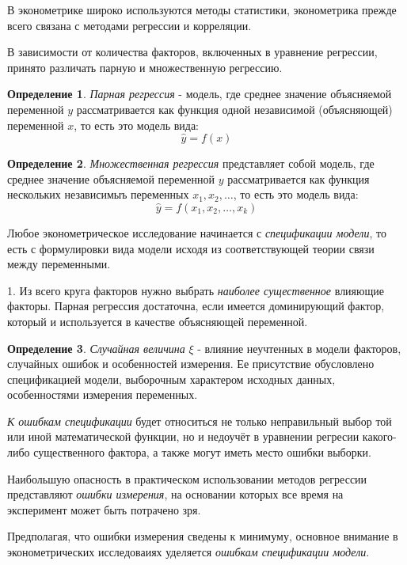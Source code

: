 \documentclass[aps,%
12pt,%
final,%
oneside,
onecolumn,%
musixtex, %
superscriptaddress,%
centertags]{article} %
\theoremstyle{plain}
\theoremstyle{definition}
\newtheorem{definition}{Определение}[subsection]
\theoremstyle{remark}
\begin{document}
В эконометрике широко используются методы статистики, эконометрика прежде всего связана с методами регрессии и корреляции.

В зависимости от количества факторов, включенных в уравнение регрессии, принято различать парную и множественную регрессию.

\begin{definition}
	\textit{Парная регрессия} - модель, где среднее значение объясняемой переменной $y$ рассматривается как функция одной независимой (объясняющей) переменной $x$, то есть это модель вида:
	$$\hat{y} = f(x)$$
\end{definition}

\begin{definition}
	\textit{Множественная регрессия} представляет собой модель, где среднее значение объясняемой переменной $y$ рассматривается как функция нескольких независимыъ переменных $x_1,x_2,\ldots$, то есть это модель вида:
	$$\hat{y} = f(x_1,x_2,\ldots,x_k)$$
\end{definition}

Любое эконометрическое исследование начинается с \textit{спецификации модели}, то есть с формулировки вида модели исходя из соответствующей теории связи между переменными.

1. Из всего круга факторов нужно выбрать \textit{наиболее существенное} влияющие факторы. Парная регрессия достаточна, если имеется доминирующий фактор, который и используется в качестве объясняющей переменной.

\begin{definition}
	\textit{Случайная величина} $\xi$ - влияние неучтенных в модели факторов, случайных ошибок и особенностей измерения. Ее присутствие обусловлено спецификацией модели, выборочным характером исходных данных, особенностями измерения переменных.
\end{definition}

\textit{К ошибкам спецификации} будет относиться не только неправильный выбор той или иной математической функции, но и недоучёт в уравнении регресии какого-либо существенного фактора, а также могут иметь место ошибки выборки.

Наибольшую опасность в практическом использовании методов регрессии представляют \textit{ошибки измерения}, на основании которых все время на эксперимент может быть потрачено зря.

Предполагая, что ошибки измерения сведены к минимуму, основное внимание в эконометрических исследоваиях уделяется \textit{ошибкам спецификации модели}.
\end{document}
